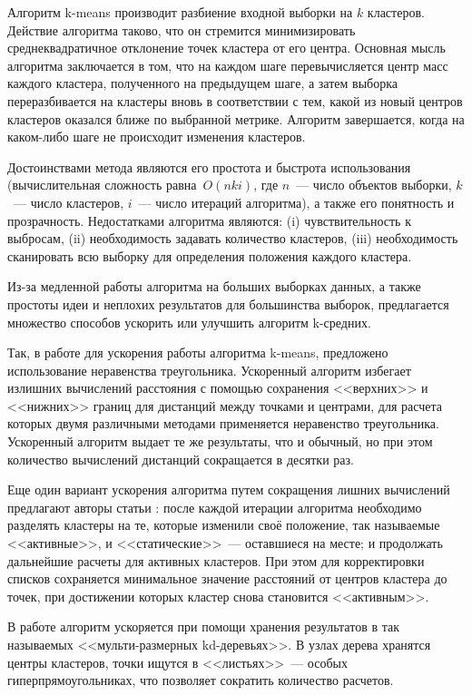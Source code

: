 Алгоритм k-means производит разбиение входной выборки на \( k \) кластеров. Действие алгоритма таково, что он стремится минимизировать среднеквадратичное отклонение точек кластера от его центра. Основная мысль алгоритма заключается в том, что на каждом шаге перевычисляется центр масс каждого кластера, полученного на предыдущем шаге, а затем выборка переразбивается на кластеры вновь в соответствии с тем, какой из новый центров кластеров оказался ближе по выбранной метрике. Алгоритм завершается, когда на каком-либо шаге не происходит изменения кластеров.

Достоинствами метода являются его простота и быстрота использования (вычислительная сложность равна~\( O(nki) \), где \( n \)~--- число объектов выборки, \( k \)~--- число кластеров, \( i \)~--- число итераций алгоритма), а также его понятность и прозрачность. Недостатками алгоритма являются: (i) чувствительность к выбросам, (ii) необходимость задавать количество кластеров, (iii) необходимость сканировать всю выборку для определения положения каждого кластера.

Из-за медленной работы алгоритма на больших выборках данных, а также простоты идеи и неплохих результатов для большинства выборок, предлагается множество способов ускорить или улучшить алгоритм k-средних.

Так, в работе \cite{elcan} для ускорения работы алгоритма k-means, предложено использование неравенства треугольника. Ускоренный алгоритм избегает излишних вычислений расстояния с помощью сохранения <<верхних>> и <<нижних>> границ для дистанций между точками и центрами, для расчета которых двумя различными методами применяется неравенство треугольника. Ускоренный алгоритм выдает те же результаты, что и обычный, но при этом количество вычислений дистанций сокращается в десятки раз.

Еще один вариант ускорения алгоритма путем сокращения лишних вычислений предлагают авторы статьи \cite{fastkm}: после каждой итерации алгоритма необходимо разделять кластеры на те, которые изменили своё положение, так называемые <<активные>>, и <<статические>>~--- оставшиеся на месте; и продолжать дальнейшие расчеты для активных кластеров. При этом для корректировки списков сохраняется минимальное значение расстояний от центров кластера до точек, при достижении которых кластер снова становится <<активным>>.

В работе \cite{mrkd} алгоритм ускоряется при помощи хранения результатов в так называемых <<мульти-размерных kd-деревьях>>. В узлах дерева хранятся центры кластеров, точки ищутся в <<листьях>>~--- особых гиперпрямоугольниках, что позволяет сократить количество расчетов.

